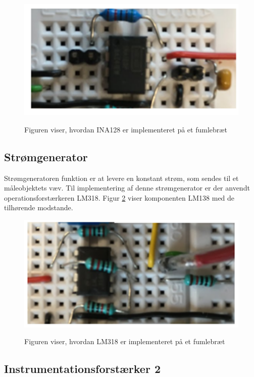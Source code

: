 \begin{figure}[H] 
\centering
{\includegraphics[width=\linewidth]
{Figure/INA128IM}}
\caption{Figuren viser, hvordan INA128 er implementeret på et fumlebræt  }
\label{figScrip}
\end{figure}



\subsection{Strømgenerator}
Strømgeneratoren funktion er at levere en konstant strøm, som sendes til et måleobjektets væv. Til implementering af denne strømgenerator er der anvendt operationsforstærkeren LM318. Figur \ref{figScrip1}
viser komponenten LM138 med de tilhørende modstande. 
\begin{figure}[H] 
\centering
{\includegraphics[width=\linewidth]
{Figure/LM318IM}}
\caption{Figuren viser, hvordan LM318 er implementeret på et fumlebræt  }
\label{figScrip1}
\end{figure}


\subsection{Instrumentationsforstærker 2}

